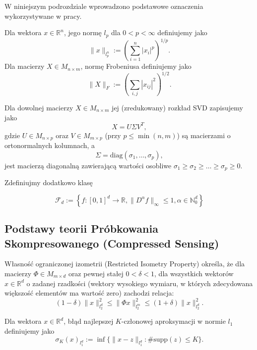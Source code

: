 W niniejszym podrozdziale wprowadzono podstawowe oznaczenia wykorzystywane w pracy.

\begin{df}
Dla wektora $x \in \mathbb{R}^n$, jego normę $l_p$ dla $0 < p < \infty$ definiujemy jako 
$$\|x\|_{l_p^n} := \left(\sum_{i=1}^n |x_i|^p\right)^{1/p}.$$
Dla macierzy $X \in M_{n \times m}$, normę Frobeniusa definiujemy jako
$$\|X\|_F := \left(\sum_{i,j} |x_{ij}|^2\right)^{1/2}.$$
\end{df}

\begin{df}
Dla dowolnej macierzy $X \in M_{n \times m}$ jej (zredukowany) rozkład SVD zapisujemy jako $$X = U \Sigma V^T,$$ gdzie $U \in M_{n \times p}$ oraz $V \in M_{m \times p}$ (przy $p \le \min(n,m)$) są macierzami o ortonormalnych kolumnach, a
$$\Sigma = \text{diag}(\sigma_1, \dots, \sigma_p),$$
jest macierzą diagonalną zawierającą wartości osobliwe $\sigma_1 \ge \sigma_2 \ge \dots \ge \sigma_p \ge 0$.
\end{df}

Zdefiniujmy dodatkowo klasę

$$ \mathcal{F}_d := \left\{ f: [0,1]^d \rightarrow \mathbb{R}, \lVert D^\alpha f\rVert_{\infty} \leq 1, \alpha \in \mathbb{N}^d_0\right\}$$

\subsection{Podstawy teorii Próbkowania Skompresowanego (Compressed Sensing)}

\begin{df}
Własność ograniczonej izometrii (Restricted Isometry Property) określa, że dla macierzy $\Phi \in M_{m \times d}$ oraz pewnej stałej $0 < \delta < 1$, dla wszystkich wektorów $x \in \mathbb{R}^d$ o zadanej rzadkości (wektory wysokiego wymiaru, w których zdecydowana większość elementów ma wartość zero) zachodzi relacja: 
$$(1-\delta)\|x\|_{l_2^d}^2 \le \|\Phi x\|_{l_2^m}^2 \le (1+\delta)\|x\|_{l_2^d}^2.$$
\end{df}

\begin{df}
Dla wektora $x \in \mathbb{R}^d$, błąd najlepszej $K$-członowej aproksymacji w normie $l_1$ definiujemy jako $$\sigma_K(x)_{l_1^d} := \inf \{ \|x - z\|_{l_1^d} : \#\text{supp}(z) \le K \}.$$
\end{df}

